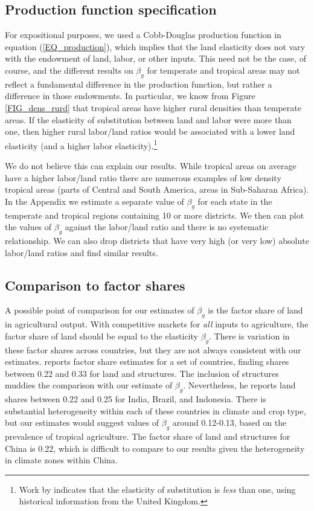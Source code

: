\documentclass[12pt]{article}
\begin{document}
\subsection{Production function specification}
For expositional purposes, we used a Cobb-Douglas production function in equation (\ref{EQ_production}), which implies that the land elasticity does not vary with the endowment of land, labor, or other inputs. This need not be the case, of course, and the different results on $\beta_g$ for temperate and tropical areas may not reflect a fundamental difference in the production function, but rather a difference in those endowments. In particular, we know from Figure \ref{FIG_dens_rurd} that tropical areas have higher rural densities than temperate areas. If the elasticity of substitution between land and labor were more than one, then higher rural labor/land ratios would be associated with a lower land elasticity (and a higher labor elasticity).\footnote{Work by \citet{wilde2012} indicates that the elasticity of substitution is \textit{less} than one, using historical information from the United Kingdom.}

We do not believe this can explain our results. While tropical areas on average have a higher labor/land ratio there are numerous examples of low density tropical areas (parts of Central and South America, areas in Sub-Saharan Africa). In the Appendix we estimate a separate value of $\beta_g$ for each state in the temperate and tropical regions containing 10 or more districts. We then can plot the values of $\beta_g$ against the labor/land ratio and there is no systematic relationship. We can also drop districts that have very high (or very low) absolute labor/land ratios and find similar results.

\subsection{Comparison to factor shares}
A possible point of comparison for our estimates of $\beta_g$ is the factor share of land in agricultural output. With competitive markets for \textit{all} inputs to agriculture, the factor share of land should be equal to the elasticity $\beta_g$. There is variation in these factor shares across countries, but they are not always consistent with our estimates. \citet{fuglie2010} reports factor share estimates for a set of countries, finding shares between 0.22 and 0.33 for land and structures. The inclusion of structures muddies the comparison with our estimate of $\beta_g$. Nevertheless, he reports land shares between 0.22 and 0.25 for India, Brazil, and Indonesia. There is substantial heterogeneity within each of these countries in climate and crop type, but our estimates would suggest values of $\beta_g$ around 0.12-0.13, based on the prevalence of tropical agriculture. The factor share of land and structures for China is 0.22, which is difficult to compare to our results given the heterogeneity in climate zones within China.
\end{document}
